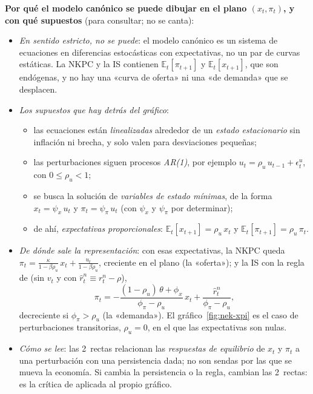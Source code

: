 \documentclass[11pt]{article}
\begin{document}
\begin{anotaciones}
\textbf{Por qué el modelo canónico se puede dibujar en el plano $(x_t,\pi_t)$, y con qué supuestos} (para consultar; no se canta):
\begin{itemize}
\item \emph{En sentido estricto, no se puede}: el modelo canónico es un sistema de ecuaciones en diferencias estocásticas con expectativas, no un par de curvas estáticas. La NKPC y la IS contienen $\mathbb{E}_t[\pi_{t+1}]$ y $\mathbb{E}_t[x_{t+1}]$, que son endógenas, y no hay una «curva de oferta» ni una «de demanda» que se desplacen.
\item \emph{Los supuestos que hay detrás del gráfico}:
  \begin{itemize}
  \item las ecuaciones están \emph{linealizadas} alrededor de un \emph{estado estacionario} sin inflación ni brecha, y solo valen para desviaciones pequeñas;
  \item las perturbaciones siguen procesos \emph{AR(1)}, por ejemplo $u_t=\rho_u\,u_{t-1}+\epsilon^u_t$, con $0\leq\rho_u<1$;
  \item se busca la solución de \emph{variables de estado mínimas}, de la forma $x_t=\psi_x\,u_t$ y $\pi_t=\psi_\pi\,u_t$ (con $\psi_x$ y $\psi_\pi$ por determinar);
  \item de ahí, \emph{expectativas proporcionales}: $\mathbb{E}_t[x_{t+1}]=\rho_u\,x_t$ y $\mathbb{E}_t[\pi_{t+1}]=\rho_u\,\pi_t$.
  \end{itemize}
\item \emph{De dónde sale la representación}: con esas expectativas, la NKPC queda $\pi_t=\frac{\kappa}{1-\beta\rho_u}\,x_t+\frac{u_t}{1-\beta\rho_u}$, creciente en el plano (la «oferta»); y la IS con la regla de  (sin $v_t$ y con $\hat r^n_t\equiv r^n_t-\rho$),
  \begin{equation*}
  \pi_t=-\frac{(1-\rho_u)\,\theta+\phi_x}{\phi_\pi-\rho_u}\,x_t+\frac{\hat r^n_t}{\phi_\pi-\rho_u},
  \end{equation*}
  decreciente si $\phi_\pi>\rho_u$ (la «demanda»). El gráfico~\ref{fig:nek-xpi} es el caso de perturbaciones transitorias, $\rho_u=0$, en el que las expectativas son nulas.
\item \emph{Cómo se lee}: las 2~rectas relacionan las \emph{respuestas de equilibrio} de $x_t$ y $\pi_t$ a una perturbación con una persistencia dada; no son sendas por las que se mueva la economía. Si cambia la persistencia o la regla, cambian las 2~rectas: es la crítica de  aplicada al propio gráfico.
\end{itemize}
\end{anotaciones}
\end{document}
